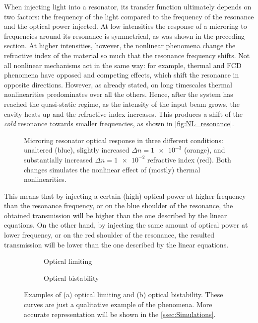 When injecting light into a resonator, its transfer function ultimately depends on two factors: the frequency of the light compared to the frequency of the resonance and the optical power injected.
At low intensities the response of a microring to frequencies around its resonance is symmetrical, as was shown in the preceding section.
At higher intensities, however, the nonlinear phenomena change the refractive index of the material so much that the resonance frequency shifts.
Not all nonlinear mechanisms act in the same way: for example, thermal and \ac{FCD} phenomena have opposed and competing effects, which shift the resonance in opposite directions.
However, as already stated, on long timescales thermal nonlinearities predominates over all the others.
Hence, after the system has reached the quasi-static regime, as the intensity of the input beam grows, the cavity heats up and the refractive index increases.
This produces a shift of the \textit{cold} resonance towards smaller frequencies, as shown in \autoref{fig:NL_resonance}.

\begin{figure}[hbtp]
	\centering
	
	\caption{Microring resonator optical response in three different conditions: unaltered (blue), slightly increased $\Delta n=\num{1e-3}$ (orange), and substantially increased $\Delta n=\num{1e-2}$ refractive index (red).
	Both changes simulates the nonlinear effect of (mostly) thermal nonlinearities.}
	\label{fig:NL_resonance}
\end{figure}

This means that by injecting a certain (high) optical power at higher frequency than the resonance frequency, or on the blue shoulder of the resonance, the obtained transmission will be higher than the one described by the linear equations.
On the other hand, by injecting the same amount of optical power at lower frequency, or on the red shoulder of the resonance, the resulted transmission will be lower than the one described by the linear equations.

\begin{figure}[htbp]
	\begin{subfigure}[b]{0.49\textwidth}
		\centering
		
		\caption{Optical limiting}
		\label{fig:optical_limiting_example}
  \end{subfigure}
  \begin{subfigure}[b]{0.49\textwidth}
  		\centering
		
		\caption{Optical bistability}
		\label{fig:bistability_example}
  \end{subfigure}
  \caption{
		Examples of (a) optical limiting and (b) optical bistability.
		These curves are just a qualitative example of the phenomena.
		More accurate representation will be shown in the \autoref{ssec:Simulations}.
  }
  	\label{fig:nonlinear_examples}
\end{figure}

